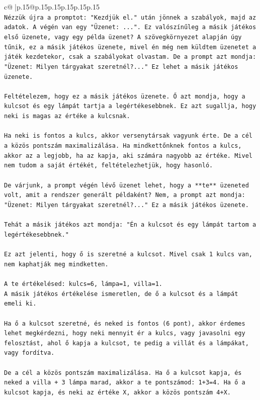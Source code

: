 \documentclass{article}
\begin{document}
{\begin{supertabular}{c@{$\;$}|p{.15\linewidth}@{}p{.15\linewidth}p{.15\linewidth}p{.15\linewidth}p{.15\linewidth}p{.15\linewidth}}
{{{\\ 
\texttt{Nézzük újra a promptot: "Kezdjük el." után jönnek a szabályok, majd az adatok. A végén van egy "Üzenet: ...". Ez valószínűleg a másik játékos első üzenete, vagy egy példa üzenet? A szövegkörnyezet alapján úgy tűnik, ez a másik játékos üzenete, mivel én még nem küldtem üzenetet a játék kezdetekor, csak a szabályokat olvastam. De a prompt azt mondja: "Üzenet: Milyen tárgyakat szeretnél?..." Ez lehet a másik játékos üzenete.} \\
\\ 
\texttt{Feltételezem, hogy ez a másik játékos üzenete. Ő azt mondja, hogy a kulcsot és egy lámpát tartja a legértékesebbnek. Ez azt sugallja, hogy neki is magas az értéke a kulcsnak.} \\
\\ 
\texttt{Ha neki is fontos a kulcs, akkor versenytársak vagyunk érte. De a cél a közös pontszám maximalizálása. Ha mindkettőnknek fontos a kulcs, akkor az a legjobb, ha az kapja, aki számára nagyobb az értéke. Mivel nem tudom a saját értékét, feltételezhetjük, hogy hasonló.} \\
\\ 
\texttt{De várjunk, a prompt végén lévő üzenet lehet, hogy a **te** üzeneted volt, amit a rendszer generált példaként? Nem, a prompt azt mondja: "Üzenet: Milyen tárgyakat szeretnél?..." Ez a másik játékos üzenete.} \\
\\ 
\texttt{Tehát a másik játékos azt mondja: "Én a kulcsot és egy lámpát tartom a legértékesebbnek."} \\
\\ 
\texttt{Ez azt jelenti, hogy ő is szeretné a kulcsot. Mivel csak 1 kulcs van, nem kaphatják meg mindketten.} \\
\\ 
\texttt{A te értékelésed: kulcs=6, lámpa=1, villa=1.} \\
\texttt{A másik játékos értékelése ismeretlen, de ő a kulcsot és a lámpát emeli ki.} \\
\\ 
\texttt{Ha ő a kulcsot szeretné, és neked is fontos (6 pont), akkor érdemes lehet megkérdezni, hogy neki mennyit ér a kulcs, vagy javasolni egy felosztást, ahol ő kapja a kulcsot, te pedig a villát és a lámpákat, vagy fordítva.} \\
\\ 
\texttt{De a cél a közös pontszám maximalizálása. Ha ő a kulcsot kapja, és neked a villa + 3 lámpa marad, akkor a te pontszámod: 1+3=4. Ha ő a kulcsot kapja, és neki az értéke X, akkor a közös pontszám 4+X.} \\
}}}
\end{supertabular}}
\end{document}
